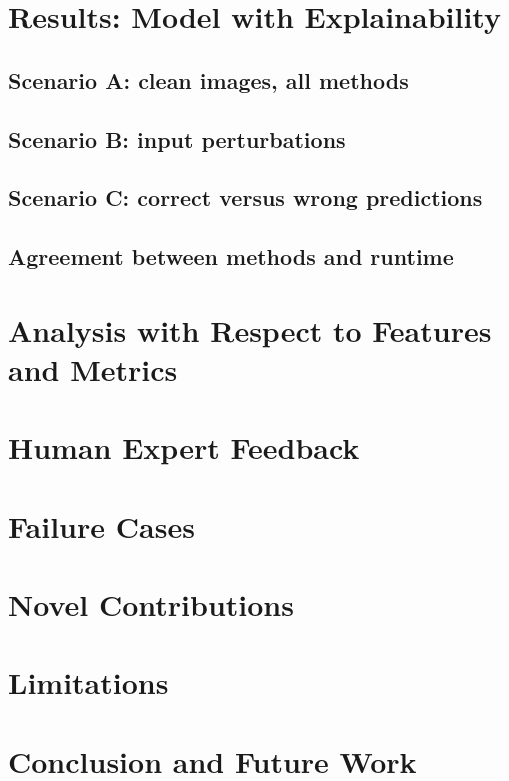 \documentclass[12pt,a4paper]{article}
\begin{document}
\section{Results: Model with Explainability}
\subsection{Scenario A: clean images, all methods}
\subsection{Scenario B: input perturbations}
\subsection{Scenario C: correct versus wrong predictions}
\subsection{Agreement between methods and runtime}

\section{Analysis with Respect to Features and Metrics}

\section{Human Expert Feedback}

\section{Failure Cases}

\section{Novel Contributions}
\begin{enumerate}
\end{enumerate}

\section{Limitations}

\section{Conclusion and Future Work}



\end{document}
